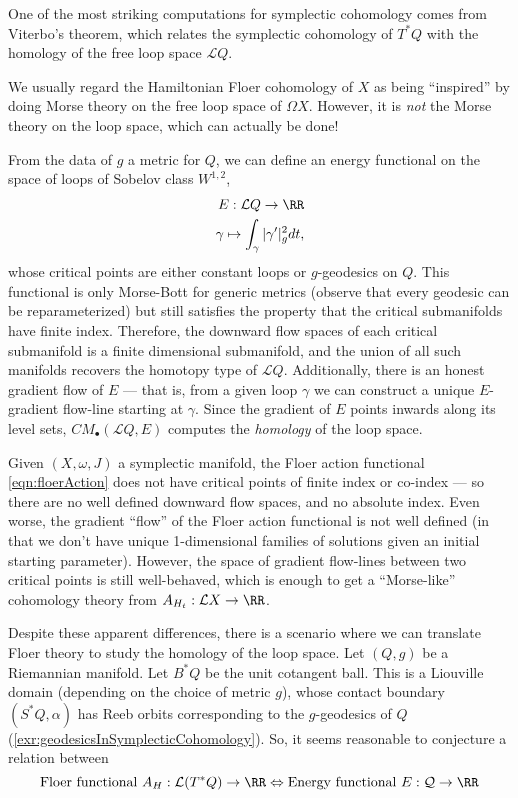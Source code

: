 
    One of the most striking computations for symplectic cohomology comes from Viterbo's theorem, which relates the symplectic cohomology of $T^*Q$ with the homology of the free loop space $\mathcal L Q$.
    
    We usually regard the Hamiltonian Floer cohomology of $X$ as being ``inspired'' by doing Morse theory on the free loop space of $\Omega X$. However, it is \emph{not} the Morse theory on the loop space, which can actually be done!

    From the data of $g$ a metric for $Q$, we can define an energy functional on the space of loops of Sobelov class $W^{1,2}$,
    \begin{align*}
        E: \mathcal LQ\to \RR\\
        \gamma\mapsto \int_{\gamma}|\gamma'|^2_gdt,
    \end{align*}
    whose critical points are either constant loops or $g$-geodesics on $Q$. 
    This functional is only Morse-Bott for generic metrics (observe that every geodesic can be reparameterized) but still satisfies the property that the critical submanifolds have finite index. Therefore, the downward flow spaces of each critical submanifold is a finite dimensional submanifold, and the union of all such manifolds recovers the homotopy type of $\mathcal LQ$. Additionally, there is an honest gradient flow of $E$ --- that is, from a given loop $\gamma$ we can construct a unique $E$-gradient flow-line starting at $\gamma$. Since the gradient of $E$ points inwards along its level sets,  $CM_\bullet(\mathcal LQ, E)$ computes the \emph{homology} of the loop space.

    Given $(X, \omega, J)$ a symplectic manifold, the Floer action functional \cref{eqn:floerAction} does not have critical points of finite index or co-index --- so there are no well defined downward flow spaces, and no absolute index. Even worse, the gradient ``flow'' of the Floer action functional is not well defined (in that we don't have unique 1-dimensional families of solutions given an initial starting parameter). However, the space of gradient flow-lines between two critical points is still well-behaved, which is enough to get a ``Morse-like'' cohomology theory from $A_{H_t}:\mathcal L X \to \RR$.

    Despite these apparent differences, there is a scenario where we can translate Floer theory to study the homology of the loop space. Let $(Q, g)$ be a Riemannian manifold. Let $B^*Q$ be the unit cotangent ball. This is a Liouville domain (depending on the choice of metric $g$), whose contact boundary $(S^*Q, \alpha)$ has Reeb orbits corresponding to the $g$-geodesics of $Q$ (\cref{exr:geodesicsInSymplecticCohomology}). So, it seems reasonable to  conjecture a relation between 
    \[\text{Floer functional $A_{H}:\mathcal L(T^*Q)\to \RR$}\Leftrightarrow\text{Energy functional $E:\mathcal Q\to \RR$}\]

